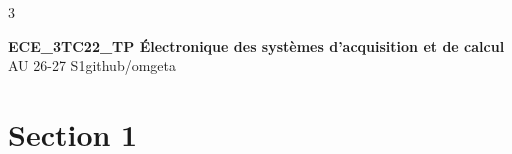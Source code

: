 \documentclass[12pt, a4paper]{article}
\newcommand{\mytitle}{ECE\_3TC22\_TP Électronique des systèmes d'acquisition et de calcul}
\newcommand{\myauthor}{github/omgeta}
\newcommand{\mydate}{AU 26-27 S1}
\begin{document}
\raggedright
\footnotesize
\begin{multicols*}{3}
\setlength{\premulticols}{1pt}
\setlength{\postmulticols}{1pt}
\setlength{\multicolsep}{1pt}
\setlength{\columnsep}{2pt}

{\normalsize{\textbf{\mytitle}}}\\
{\footnotesize{\mydate\hspace{2pt}\textemdash\hspace{2pt}\myauthor}}
\section{Section 1}
\end{multicols*}
\end{document}
